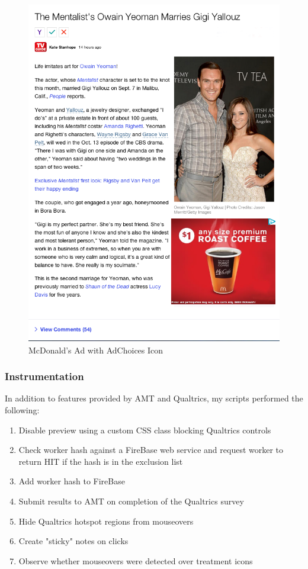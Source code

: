 \begin{figure}
\centerline{
\includegraphics[scale=.3]{chapter6.tex/2a-daa}
}
\caption{McDonald's Ad with AdChoices Icon}
\label{2A-adchoices}
\end{figure}


\subsubsection{Instrumentation}
\label{instrumentation}

In addition to features provided by AMT and Qualtrics, my scripts performed the following:

\begin{sloppier}
\begin{enumerate}
\item Disable preview using a custom CSS class blocking Qualtrics controls
\item Check worker hash against a FireBase web service and request worker to return HIT if the hash is in the exclusion list
\item Add worker hash to FireBase
\item Submit results to AMT on completion of the Qualtrics survey
\item Hide Qualtrics hotspot regions from mouseovers
\item  Create "sticky" notes on clicks
\item  Observe whether mouseovers were detected over treatment icons
\end{enumerate}
\end{sloppier}

